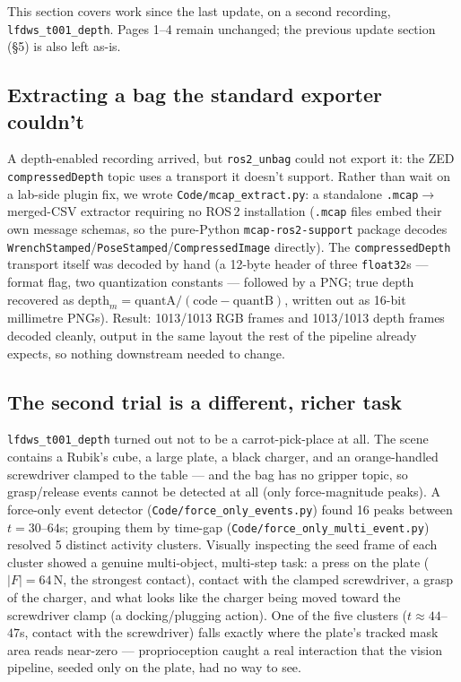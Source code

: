 \documentclass[11pt]{article}
\begin{document}
This section covers work since the last update, on a second recording,
\texttt{lfdws\_t001\_depth}. Pages 1--4 remain unchanged; the previous
update section (\S5) is also left as-is.

\subsection{Extracting a bag the standard exporter couldn't}

A depth-enabled recording arrived, but \texttt{ros2\_unbag} could not export
it: the ZED \texttt{compressedDepth} topic uses a transport it doesn't
support. Rather than wait on a lab-side plugin fix, we wrote
\texttt{Code/mcap\_extract.py}: a standalone \texttt{.mcap}$\to$merged-CSV
extractor requiring no ROS\,2 installation (\texttt{.mcap} files embed their
own message schemas, so the pure-Python \texttt{mcap-ros2-support} package
decodes \texttt{WrenchStamped}/\texttt{PoseStamped}/\texttt{CompressedImage}
directly). The \texttt{compressedDepth} transport itself was decoded by hand
(a 12-byte header of three \texttt{float32}s --- format flag, two
quantization constants --- followed by a PNG; true depth recovered as
$\text{depth}_m = \text{quantA}/(\text{code} - \text{quantB})$, written out
as 16-bit millimetre PNGs). Result: 1013/1013 RGB frames and 1013/1013 depth
frames decoded cleanly, output in the same layout the rest of the pipeline
already expects, so nothing downstream needed to change.

\subsection{The second trial is a different, richer task}

\texttt{lfdws\_t001\_depth} turned out not to be a carrot-pick-place at all.
The scene contains a Rubik's cube, a large plate, a black charger, and an
orange-handled screwdriver clamped to the table --- and the bag has no
gripper topic, so grasp/release events cannot be detected at all (only
force-magnitude peaks). A force-only event detector
(\texttt{Code/force\_only\_events.py}) found 16 peaks between $t{=}30$--$64$s;
grouping them by time-gap
(\texttt{Code/force\_only\_multi\_event.py}) resolved 5 distinct activity
clusters. Visually inspecting the seed frame of each cluster showed a
genuine multi-object, multi-step task: a press on the plate ($|F|{=}64$\,N,
the strongest contact), contact with the clamped screwdriver, a grasp of the
charger, and what looks like the charger being moved toward the screwdriver
clamp (a docking/plugging action). One of the five clusters
($t{\approx}44$--$47$s, contact with the screwdriver) falls exactly where the
plate's tracked mask area reads near-zero --- proprioception caught a real
interaction that the vision pipeline, seeded only on the plate, had no way
to see.
\end{document}
